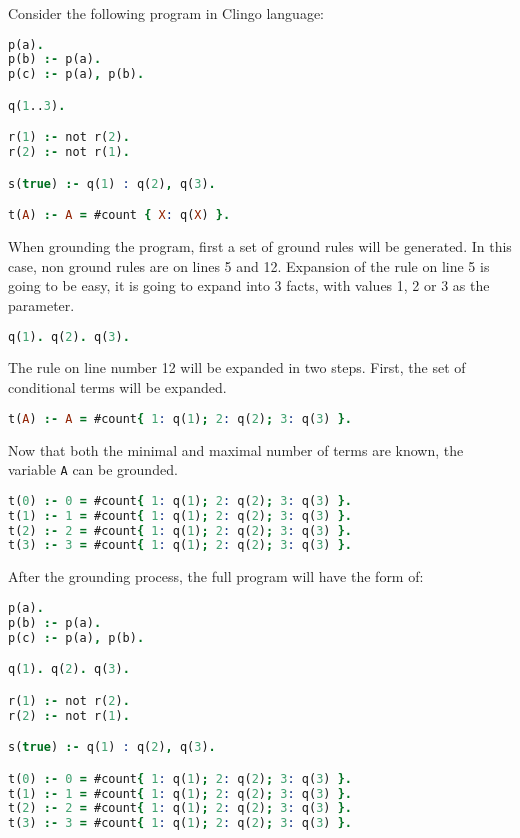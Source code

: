 \begin{example}\label{exp:gringo_grounding}
    Consider the following program in Clingo language:
    \begin{lstlisting}[language=prolog]
p(a).
p(b) :- p(a).
p(c) :- p(a), p(b).

q(1..3).

r(1) :- not r(2).
r(2) :- not r(1).

s(true) :- q(1) : q(2), q(3).

t(A) :- A = #count { X: q(X) }.
\end{lstlisting}

    When grounding the program, first a set of ground rules will be generated.
    In this case, non ground rules are on lines 5 and 12. Expansion of the rule
    on line 5 is going to be easy, it is going to expand into 3 facts,
    with values 1, 2 or 3 as the parameter.
    \begin{lstlisting}[language=prolog, firstnumber=5]
q(1). q(2). q(3).
\end{lstlisting}
    The rule on line number 12 will be expanded in two steps. First, the set of
    conditional terms will be expanded.
    \begin{lstlisting}[language=prolog, firstnumber=12]
t(A) :- A = #count{ 1: q(1); 2: q(2); 3: q(3) }.
\end{lstlisting}
	Now that both the minimal and maximal number of terms are known, the variable
    \texttt{A} can be grounded.
    \begin{lstlisting}[language=prolog, firstnumber=12]
t(0) :- 0 = #count{ 1: q(1); 2: q(2); 3: q(3) }.
t(1) :- 1 = #count{ 1: q(1); 2: q(2); 3: q(3) }.
t(2) :- 2 = #count{ 1: q(1); 2: q(2); 3: q(3) }.
t(3) :- 3 = #count{ 1: q(1); 2: q(2); 3: q(3) }.
\end{lstlisting}

    After the grounding process, the full program will have the form of:
    \begin{lstlisting}[language=prolog]
p(a).
p(b) :- p(a).
p(c) :- p(a), p(b).

q(1). q(2). q(3).

r(1) :- not r(2).
r(2) :- not r(1).

s(true) :- q(1) : q(2), q(3).

t(0) :- 0 = #count{ 1: q(1); 2: q(2); 3: q(3) }.
t(1) :- 1 = #count{ 1: q(1); 2: q(2); 3: q(3) }.
t(2) :- 2 = #count{ 1: q(1); 2: q(2); 3: q(3) }.
t(3) :- 3 = #count{ 1: q(1); 2: q(2); 3: q(3) }.
\end{lstlisting}


\end{example}
